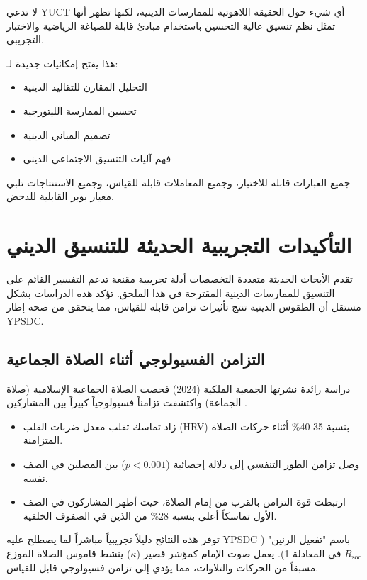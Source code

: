 \documentclass[12pt,a4paper]{article}
\begin{document}
	لا تدعي YUCT أي شيء حول الحقيقة اللاهوتية للممارسات الدينية، لكنها تظهر أنها تمثل نظم تنسيق عالية التحسين باستخدام مبادئ قابلة للصياغة الرياضية والاختبار التجريبي.
	
	هذا يفتح إمكانيات جديدة لـ:
	\begin{itemize}
		\item التحليل المقارن للتقاليد الدينية
		\item تحسين الممارسة الليتورجية
		\item تصميم المباني الدينية
		\item فهم آليات التنسيق الاجتماعي‐الديني
	\end{itemize}
	
	جميع العبارات قابلة للاختبار، وجميع المعاملات قابلة للقياس، وجميع الاستنتاجات تلبي معيار بوبر القابلية للدحض.
	
	\section{التأكيدات التجريبية الحديثة للتنسيق الديني}
	\label{sec:recent-studies}
	
	تقدم الأبحاث الحديثة متعددة التخصصات أدلة تجريبية مقنعة تدعم التفسير القائم على التنسيق للممارسات الدينية المقترحة في هذا الملحق. تؤكد هذه الدراسات بشكل مستقل أن الطقوس الدينية تنتج تأثيرات تزامن قابلة للقياس، مما يتحقق من صحة إطار YPSDC.
	
	\subsection{التزامن الفسيولوجي أثناء الصلاة الجماعية}
	
	دراسة رائدة نشرتها الجمعية الملكية (2024) فحصت الصلاة الجماعية الإسلامية (صلاة الجماعة) واكتشفت تزامناً فسيولوجياً كبيراً بين المشاركين \cite{RoyalSociety2024}.
	\begin{itemize}
		\item زاد تماسك تقلب معدل ضربات القلب (HRV) بنسبة 35-40\% أثناء حركات الصلاة المتزامنة.
		\item وصل تزامن الطور التنفسي إلى دلالة إحصائية ($p < 0.001$) بين المصلين في الصف نفسه.
		\item ارتبطت قوة التزامن بالقرب من إمام الصلاة، حيث أظهر المشاركون في الصف الأول تماسكاً أعلى بنسبة 28\% من الذين في الصفوف الخلفية.
	\end{itemize}
	
	توفر هذه النتائج دليلاً تجريبياً مباشراً لما يصطلح عليه YPSDC باسم "تفعيل الرنين" ($R_{\mathrm{soc}}$ في المعادلة 1). يعمل صوت الإمام كمؤشر قصير ($\kappa$) ينشط قاموس الصلاة الموزع مسبقاً من الحركات والتلاوات، مما يؤدي إلى تزامن فسيولوجي قابل للقياس.
	
\end{document}
